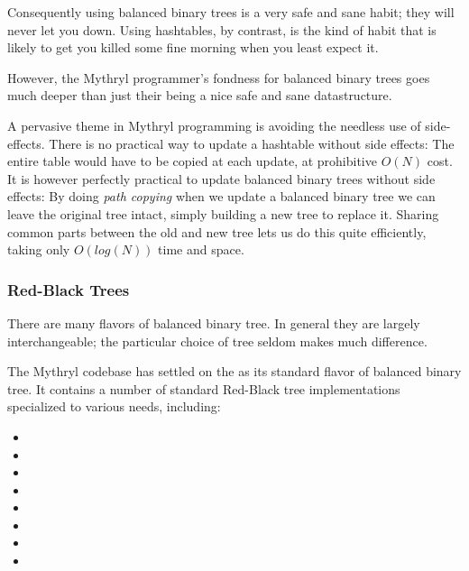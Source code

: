 Consequently using balanced binary trees is a very safe 
and sane habit;  they will never let you down.  Using 
hashtables, by contrast, is the kind of habit that is likely to get 
you killed some fine morning when you least expect it.

However, the Mythryl programmer's fondness for balanced binary trees 
goes much deeper than just their being a nice safe and sane datastructure.

A pervasive theme in Mythryl programming is avoiding the needless use 
of side-effects.  There is no practical way to update a hashtable 
without side effects: The entire table would have to be copied at 
each update, at prohibitive $O(N)$ cost. It is however perfectly practical 
to update balanced binary trees without side effects: 
By doing {\it path copying} when we update a balanced binary tree 
we can leave the original tree intact, simply building a new tree to 
replace it.  Sharing common parts between the old and new tree lets 
us do this quite efficiently, taking only $O(log(N))$ time and space. 

\cutend*
\subsubsection{Red-Black Trees}


There are many flavors of balanced binary tree.  In general they are 
largely interchangeable;  the particular choice of tree seldom makes 
much difference.

The Mythryl codebase has settled on the  
as its standard flavor of balanced binary tree.  It contains a number 
of standard Red-Black tree implementations specialized to various needs, including: 
\begin{itemize}
\item {}
\item {}
\item {}
\item {}
\item {}
\item {}
\item {}
\item {}
\end{itemize}

